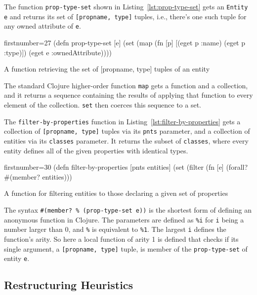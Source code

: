 \documentclass[11pt]{article}
\begin{document}
The function \verb|prop-type-set| shown in Listing~\ref{lst:prop-type-set} gets
an \verb|Entity e| and returns its set of \verb|[propname, type]| tuples, i.e.,
there's one such tuple for any owned attribute of \verb|e|.

\begin{listing}[h!tbp]
  \begin{clojurecode*}{firstnumber=27}
(defn prop-type-set [e]
  (set (map (fn [p] [(eget p :name) (eget p :type)])
            (eget e :ownedAttribute))))
  \end{clojurecode*}
  \caption{A function retrieving the set of \textsf{[propname, type]} tuples of
    an entity}
    \label{lst:prop-type-set}
\end{listing}

The standard Clojure higher-order function \verb|map| gets a function and a
collection, and it returns a sequence containing the results of applying that
function to every element of the collection.  \verb|set| then coerces this
sequence to a set.


The \verb|filter-by-properties| function in
Listing~\ref{lst:filter-by-properties} gets a collection of
\verb|[propname, type]| tuples via its \verb|pnts| parameter, and a collection
of entities via its \verb|classes| parameter.  It returns the subset of
\verb|classes|, where every entity defines all of the given properties with
identical types.

\begin{listing}[htbp]
  \begin{clojurecode*}{firstnumber=30}
(defn filter-by-properties [pnts entities]
  (set (filter (fn [e]
                 (forall? #(member? %
               entities)))
  \end{clojurecode*}
  \caption{A function for filtering entities to those declaring a given set of
    properties}
  \label{lst:filter-by-properties}
\end{listing}


The syntax \verb|#(member? % (prop-type-set e))| is the shortest form of
defining an anonymous function in Clojure.  The parameters are defined as
\verb|%i| for \verb|i| being
a number larger than 0, and \verb|%| is equivalent
to \verb|%1|.  The largest \verb|i| defines the function's arity.  So here a
local function of arity 1 is defined that checks if its single argument, a
\verb|[propname, type]| tuple, is member of the \verb|prop-type-set| of entity
\verb|e|.


\subsection{Restructuring Heuristics}
\label{sec:restructuring-heuristics}
\end{document}
